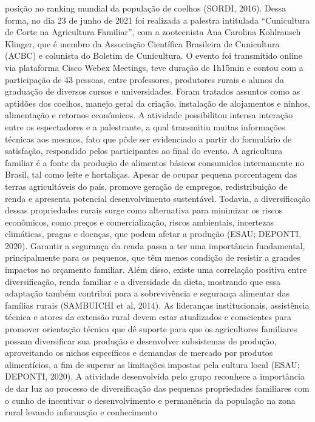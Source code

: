 posição no ranking mundial da população de coelhos (SORDI, 2016).
Dessa forma, no dia 23 de junho de 2021 foi realizada a palestra intitulada “Cunicultura
de Corte na Agricultura Familiar”, com a zootecnista Ana Carolina Kohlrausch Klinger, que é
membro da Associação Científica Brasileira de Cunicultura (ACBC) e colunista do Boletim de
Cunicultura. O evento foi transmitido online via plataforma Cisco Webex Meetings, teve duração
de 1h15min e contou com a participação de 43 pessoas, entre professores, produtores rurais e
alunos da graduação de diversos cursos e universidades. Foram tratados assuntos como as
aptidões dos coelhos, manejo geral da criação, instalação de alojamentos e ninhos, alimentação e
retornos econômicos. A atividade possibilitou intensa interação entre os espectadores e a
palestrante, a qual transmitiu muitas informações técnicas aos mesmos, fato que pôde ser
evidenciado a partir do formulário de satisfação, respondido pelos participantes ao final do
evento.
A agricultura familiar é a fonte da produção de alimentos básicos consumidos
internamente no Brasil, tal como leite e hortaliças. Apesar de ocupar pequena porcentagem das
terras agricultáveis do país, promove geração de empregos, redistribuição de renda e apresenta
potencial desenvolvimento sustentável. Todavia, a diversificação dessas propriedades rurais
surge como alternativa para minimizar os riscos econômicos, como preços e comercialização,
riscos ambientais, incertezas climáticas, pragas e doenças, que podem afetar a produção (ESAU;
DEPONTI, 2020).
Garantir a segurança da renda passa a ter uma importância fundamental, principalmente
para os pequenos, que têm menos condição de resistir a grandes impactos no orçamento familiar.
Além disso, existe uma correlação positiva entre diversificação, renda familiar e a diversidade da
dieta, mostrando que essa adaptação também contribui para a sobrevivência e segurança
alimentar das famílias rurais (SAMBUICHI et al, 2014).
As lideranças institucionais, assistência técnica e atores da extensão rural devem estar
atualizados e conscientes para promover orientação técnica que dê suporte para que os
agricultores familiares possam diversificar sua produção e desenvolver subsistemas de produção,
aproveitando os nichos específicos e demandas de mercado por produtos alimentícios, a fim de
superar as limitações impostas pela cultura local (ESAU; DEPONTI, 2020).
A atividade desenvolvida pelo grupo reconhece a importância de dar luz ao processo de
diversificação das pequenas propriedades familiares com o cunho de incentivar o
desenvolvimento e permanência da população na zona rural levando informação e conhecimento
